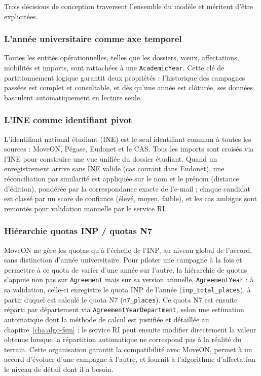 Trois décisions de conception traversent l'ensemble du modèle et méritent d'être explicitées.

\subsubsection{L'année universitaire comme axe temporel}
Toutes les entités opérationnelles, telles que les dossiers, vœux, affectations, mobilités et imports, sont rattachées à une \texttt{AcademicYear}. Cette clé de partitionnement logique garantit deux propriétés : l'historique des campagnes passées est complet et consultable, et dès qu'une année est clôturée, ses données basculent automatiquement en lecture seule.

\subsubsection{L'INE comme identifiant pivot}
L'identifiant national étudiant (INE) est le seul identifiant commun à toutes les sources : MoveON, Pégase, Eudonet et le CAS. Tous les imports sont croisés via l'INE pour construire une vue unifiée du dossier étudiant. Quand un enregistrement arrive sans INE valide (cas courant dans Eudonet), une réconciliation par similarité est appliquée sur le nom et le prénom (distance d'édition), pondérée par la correspondance exacte de l'e-mail ; chaque candidat est classé par un score de confiance (élevé, moyen, faible), et les cas ambigus sont remontés pour validation manuelle par le service RI.

\subsubsection{Hiérarchie quotas INP / quotas N7}
MoveON ne gère les quotas qu'à l'échelle de l'INP, au niveau global de l'accord, sans distinction d'année universitaire. Pour piloter une campagne à la fois et permettre à ce quota de varier d'une année sur l'autre, la hiérarchie de quotas s'appuie non pas sur \texttt{Agreement} mais sur sa version annuelle, \texttt{AgreementYear} : à sa validation, celle-ci enregistre le quota INP de l'année (\texttt{inp\_total\_places}), à partir duquel est calculé le quota N7 (\texttt{n7\_places}). Ce quota N7 est ensuite réparti par département via \texttt{AgreementYearDepartment}, selon une estimation automatique dont la méthode de calcul est justifiée et détaillée au chapitre~\ref{cha:algo-fsm} ; le service RI peut ensuite modifier directement la valeur obtenue lorsque la répartition automatique ne correspond pas à la réalité du terrain. Cette organisation garantit la compatibilité avec MoveON, permet à un accord d'évoluer d'une campagne à l'autre, et fournit à l'algorithme d'affectation le niveau de détail dont il a besoin. 

